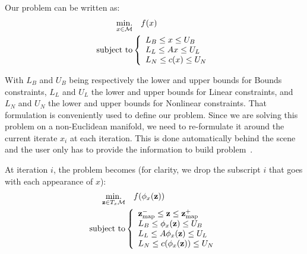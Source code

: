 Our problem can be written as:
\begin{align}
\label{eq:optim_problem_on_manifold}
  \operatorname*{min.}_{x \in \mathcal{M}} & \quad f(x)\\ \nonumber
  \text{subject to}&\left\{
  \begin{array}{lr}
    L_B \leq x \leq U_B \\
    L_L \leq Ax \leq U_L \\
    L_N \leq c(x) \leq U_N
  \end{array}\right.
\end{align}

With $L_B$ and $U_B$ being respectively the lower and upper bounds for Bounds constraints, $L_L$ and $U_L$ the lower and upper bounds for Linear constraints, and $L_N$ and $U_N$ the lower and upper bounds for Nonlinear constraints.
That formulation is conveniently used to define our problem.
Since we are solving this problem on a non-Euclidean manifold, we need to re-formulate it around the current iterate $x_i$ at each iteration.
This is done automatically behind the scene and the user only has to provide the information to build problem~.

At iteration $i$, the problem becomes (for clarity, we drop the subscript $i$ that goes with each appearance of $x$):
\begin{align}
\label{eq:optim_problem_on_txm}
  \operatorname*{min.}_{\mathbf{z} \in T_x\mathcal{M}} & \quad f(\phi_x(\mathbf{z}))\\ \nonumber
  \text{subject to}&\left\{
  \begin{array}{lr}
    {\bf z}_{\text{map}}^- \leq \mathbf{z} \leq {\bf z}_{\text{map}}^+ \\
    L_B \leq \phi_x(\mathbf{z}) \leq U_B \\
    L_L \leq A\phi_x(\mathbf{z}) \leq U_L \\
    L_N \leq c(\phi_x(\mathbf{z})) \leq U_N \\
  \end{array}\right.
\end{align}

